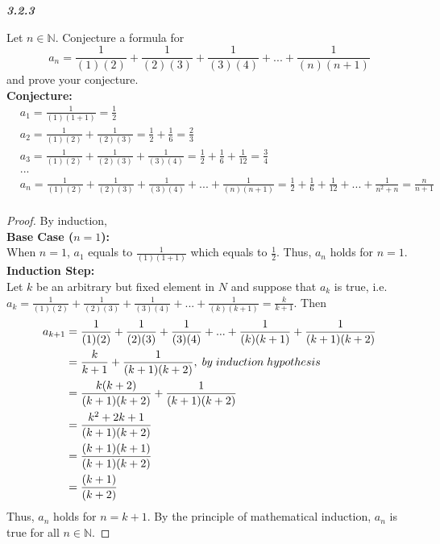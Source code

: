 \documentclass{article}
\begin{document}
\begin{flushleft}
\begin{enumerate}
\begin{flushleft}
		\end{flushleft}
		
		\textbf{\textit{3.2.3}}
		\begin{flushleft}
			Let $n \in \mathbb{N}$. Conjecture a formula for
			\[a_n = \frac{1}{(1)(2)} + \frac{1}{(2)(3)} + \frac{1}{(3)(4)} + ... + \frac{1}{(n)(n+1)}\] 
			and prove your conjecture.
			\\
			\textbf{Conjecture:}
			\begin{align*}
				& a_1 = \frac{1}{(1)(1+1)} = \frac{1}{2} \\
				& a_2 = \frac{1}{(1)(2)} + \frac{1}{(2)(3)} = \frac{1}{2} + \frac{1}{6} = \frac{2}{3} \\
				& a_3 = \frac{1}{(1)(2)} + \frac{1}{(2)(3)} + \frac{1}{(3)(4)} = \frac{1}{2} + \frac{1}{6} + \frac{1}{12} = \frac{3}{4} \\
				& ... \\
				& a_n = \frac{1}{(1)(2)} + \frac{1}{(2)(3)} + \frac{1}{(3)(4)} + ... + \frac{1}{(n)(n+1)} = \frac{1}{2} + \frac{1}{6} + \frac{1}{12} + ... + \frac{1}{n^2+n} = \frac{n}{n+1} \\
			\end{align*}
			\begin{proof}
				By induction, \\
				\textbf{Base Case ($n = 1$):}
				\\ When $n = 1$, $a_1$ equals to $\frac{1}{(1)(1+1)}$ which equals to $\frac{1}{2}$. Thus, $a_n$ holds for $n=1$.
				\\
				\textbf{Induction Step:}
				\\
				Let $k$ be an arbitrary but fixed element in $N$ and suppose that $a_k$ is true, i.e. $a_k = \frac{1}{(1)(2)} + \frac{1}{(2)(3)} + \frac{1}{(3)(4)} + ... + \frac{1}{(k)(k+1)} = \frac{k}{k+1}$. Then
				\begin{align*}
					a_{k+1} & = \frac{1}{(1)(2)} + \frac{1}{(2)(3)} + \frac{1}{(3)(4)} + ... + \frac{1}{(k)(k+1)} + \frac{1}{(k+1)(k+2)}\\
					& = \frac{k}{k+1} + \frac{1}{(k+1)(k+2)}, \thickspace by \thickspace induction \thickspace hypothesis \\
					& = \frac{k(k+2)}{(k+1)(k+2)} + \frac{1}{(k+1)(k+2)}\\
					& = \frac{k^2+2k+1}{(k+1)(k+2)} \\
					& = \frac{(k+1)(k+1)}{(k+1)(k+2)} \\
					& = \frac{(k+1)}{(k+2)}
				\end{align*}
				Thus, $a_n$ holds for $n=k+1$. 
				By the principle of mathematical induction, $a_n$ is true for all $n \in \mathbb{N}$.
			\end{proof}
		\end{flushleft}
		

\end{enumerate}
\end{flushleft}
\end{document}
